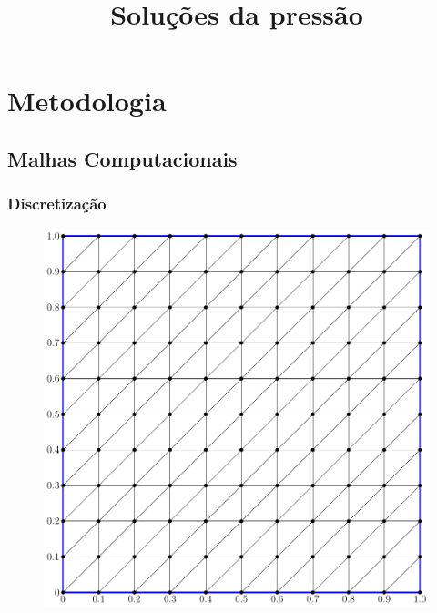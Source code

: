 \documentclass{beamer}
\begin{document}
\section{Metodologia}

\subsection{Malhas Computacionais}
\begin{frame}
  \frametitle{Discretização}
  
  \begin{figure}
    \title{Soluções da pressão}
    \begin{minipage}[t]{.49\textwidth}
      \centering
      \includegraphics[height=0.95\linewidth]{figure/structured_mesh.pdf}
    \end{minipage}
    \hfill
    \begin{minipage}[t]{.49\textwidth}
      \centering

\end{minipage}
\end{figure}
\end{frame}
\end{document}
